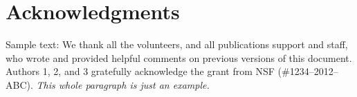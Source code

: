 \documentclass{sigchi}
\begin{document}
\section{Acknowledgments}

Sample text: We thank all the volunteers, and all publications support
and staff, who wrote and provided helpful comments on previous
versions of this document. Authors 1, 2, and 3 gratefully acknowledge
the grant from NSF (\#1234--2012--ABC). \textit{This whole paragraph is
  just an example.}

%
%
%
%
%
\balance{}

\balance{}



\end{document}
